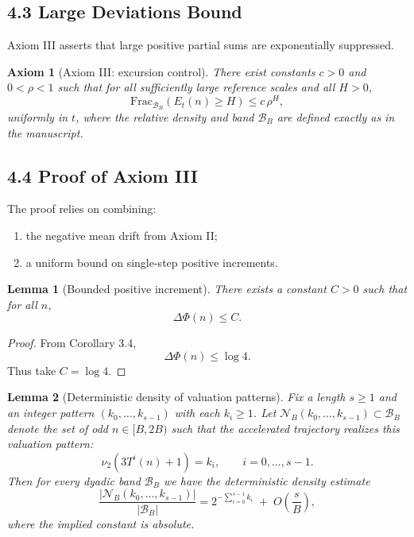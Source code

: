 \documentclass[preprint,12pt]{elsarticle}
\newtheorem{lemma}{Lemma}
\newtheorem{axiom}{Axiom}
\newcommand{\BandFrac}[2]{\mathrm{Frac}_{#1}\!\left(#2\right)} %
\begin{document}
\subsection{4.3 Large Deviations Bound}
Axiom III asserts that large positive partial sums are exponentially suppressed.
\begin{axiom}[Axiom III: excursion control]
There exist constants $c>0$ and \(0<\rho<1\) such that for all sufficiently large reference scales and all \(H>0\),
\[
\BandFrac{\mathcal{B}_B}{E_t(n) \ge H} \le c\,\rho^{H},
\]
uniformly in \(t\), where the relative density and band \(\mathcal{B}_B\) are defined exactly as in the manuscript.
\end{axiom}

\subsection{4.4 Proof of Axiom III}
The proof relies on combining:
\begin{enumerate}
\item the negative mean drift from Axiom II;
\item a uniform bound on single-step positive increments.
\end{enumerate}
\begin{lemma}[Bounded positive increment]
There exists a constant $C>0$ such that for all \(n\),
\[
\Delta\Phi(n) \le C.
\]
\end{lemma}
\begin{proof}
From Corollary 3.4,
\[
\Delta\Phi(n) \le \log 4.
\]
Thus take \(C=\log 4\).
\end{proof}

\begin{lemma}[Deterministic density of valuation patterns]
\label{lem:pattern-density}
Fix a length $s\ge 1$ and an integer pattern $(k_0,\dots,k_{s-1})$ with each
$k_i\ge 1$. Let $\mathcal{N}_B(k_0,\dots,k_{s-1})\subset \mathcal{B}_B$ denote
the set of odd $n\in[B,2B)$ such that the accelerated trajectory realizes this
valuation pattern:
\[
\nu_2(3T^i(n)+1)=k_i,\qquad i=0,\dots,s-1.
\]
Then for every dyadic band $\mathcal{B}_B$ we have the deterministic density
estimate
\[
\frac{|\mathcal{N}_B(k_0,\dots,k_{s-1})|}{|\mathcal{B}_B|}
=
2^{-\sum_{i=0}^{s-1}k_i} \;+\; O\!\left(\frac{s}{B}\right),
\]
where the implied constant is absolute.
\end{lemma}
\end{document}
